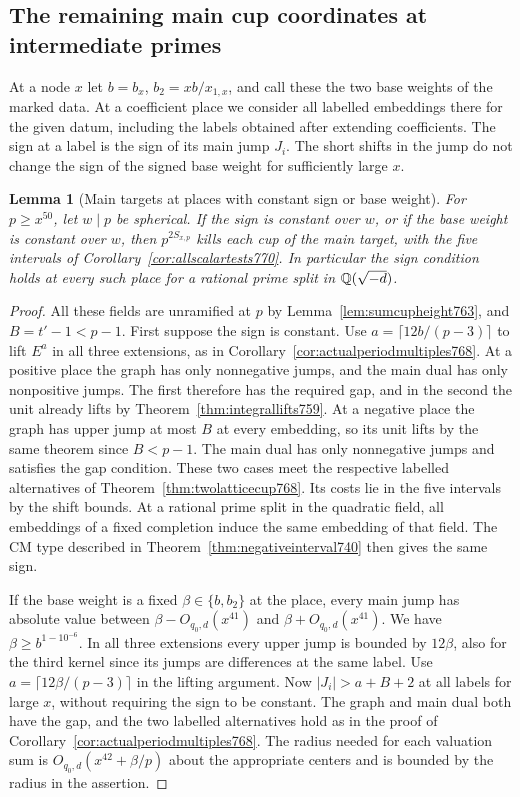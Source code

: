 \documentclass[a4paper,11pt]{article}
\newtheorem{lemma}[proposition]{Lemma}
\theoremstyle{definition}
\theoremstyle{remark}
\numberwithin{equation}{section}
\begin{document}
\subsection{The remaining main cup coordinates at intermediate primes}
\label{sec:remainingmain771}
At a node \(x\) let \(b=b_x\), \(b_2=xb/x_{1,x}\), and call
these the two base weights of the marked data. At a coefficient
place we consider all labelled embeddings there for the
given datum, including the labels obtained after extending
coefficients. The sign at a label is the sign of its main
jump \(J_i\). The short shifts in the jump do not change
the sign of the signed base weight for sufficiently large \(x\).

\begin{lemma}[Main targets at places with constant sign or base weight]
\leavevmode\label{lem:onesignmain771}
For \(p\ge x^{50}\), let \(w\mid p\) be spherical. If the
sign is constant over \(w\), or if the base weight is constant
over \(w\), then \(p^{2S_{x,p}}\) kills each cup of the main
target, with the five intervals of
Corollary~\ref{cor:allscalartests770}. In particular the
sign condition holds at every such place for a rational prime
split in \(\mathbb Q(\sqrt{-d})\).
\end{lemma}
\begin{proof}
All these fields are unramified at \(p\) by
Lemma~\ref{lem:sumcupheight763}, and \(B=t'-1<p-1\).
First suppose the sign is constant. Use
\(a=\lceil12b/(p-3)\rceil\) to lift \(E^a\) in all
three extensions, as in Corollary~\ref{cor:actualperiodmultiples768}.
At a positive place the graph has only nonnegative jumps,
and the main dual has only nonpositive jumps. The first
therefore has the required gap, and in the second the
unit already lifts by Theorem~\ref{thm:integrallifts759}.
At a negative place the graph has upper jump at most \(B\)
at every embedding, so its unit lifts by the same theorem
since \(B<p-1\). The main dual has only nonnegative jumps
and satisfies the gap condition. These two cases meet the
respective labelled alternatives of
Theorem~\ref{thm:twolatticecup768}. Its costs lie in the
five intervals by the shift bounds. At a rational prime
split in the quadratic field, all embeddings of a fixed
completion induce the same embedding of that field. The
CM type described in Theorem~\ref{thm:negativeinterval740}
then gives the same sign.

If the base weight is a fixed \(\beta\in\{b,b_2\}\) at the
place, every main jump has absolute value between
\(\beta-O_{q_0,d}(x^{41})\) and
\(\beta+O_{q_0,d}(x^{41})\). We have
\(\beta\ge b^{1-10^{-6}}\). In all three extensions every
upper jump is bounded by \(12\beta\), also for the third
kernel since its jumps are differences at the same label.
Use \(a=\lceil12\beta/(p-3)\rceil\) in the lifting
argument. Now \(|J_i|>a+B+2\) at all labels for large
\(x\), without requiring the sign to be constant.
The graph and main dual both have the gap, and the
two labelled alternatives hold as in the proof of
Corollary~\ref{cor:actualperiodmultiples768}.
The radius needed for each valuation sum is
\(O_{q_0,d}(x^{42}+\beta/p)\) about the appropriate centers
and is bounded by the radius in the assertion.
\end{proof}
\end{document}
